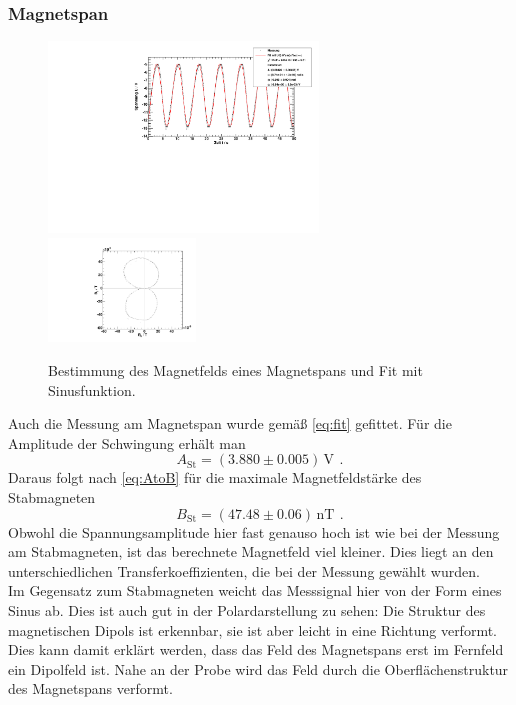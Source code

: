 \subsubsection{Magnetspan}
\begin{figure}[H]
\begin{center}
  \includegraphics[width=0.64\textwidth]{../img/fit_Magnetspan_45grad.pdf}
  \includegraphics[width=0.35\textwidth]{../img/polar_Magnetspan_45grad.pdf}
  \caption{Bestimmung des Magnetfelds eines Magnetspans und Fit mit Sinusfunktion.}
  \label{img:magnetspan}
\end{center}
\end{figure}
Auch die Messung am Magnetspan wurde gemäß \autoref{eq:fit} gefittet.
Für die Amplitude der Schwingung erhält man
\begin{equation}
A_{\text{St}}=(3.880 \pm 0.005)\, \text{V} \ \, .
\end{equation}
Daraus folgt nach \autoref{eq:AtoB} für die maximale Magnetfeldstärke des Stabmagneten
\begin{equation}
B_{\text{St}} = (47.48 \pm 0.06)\,\text{nT} \ \, .
\end{equation}
Obwohl die Spannungsamplitude hier fast genauso hoch ist wie bei der Messung am Stabmagneten,
ist das berechnete Magnetfeld viel kleiner. Dies liegt an den unterschiedlichen Transferkoeffizienten,
die bei der Messung gewählt wurden.\\ 
Im Gegensatz zum Stabmagneten weicht das Messsignal hier von der Form eines Sinus ab.
Dies ist auch gut in der Polardarstellung zu sehen:
Die Struktur des magnetischen Dipols ist erkennbar, sie ist aber leicht in eine Richtung verformt.
Dies kann damit erklärt werden, dass das Feld des Magnetspans erst im Fernfeld ein Dipolfeld ist.
Nahe an der Probe wird das Feld durch die Oberflächenstruktur des Magnetspans verformt.


